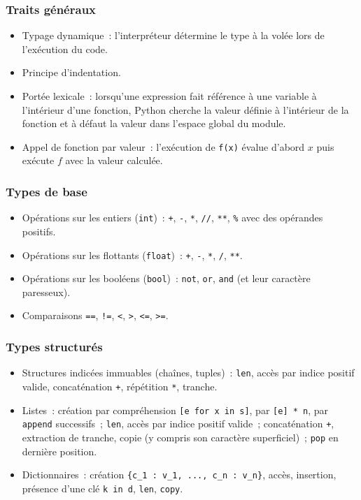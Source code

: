 \documentclass[book]{magnoliaold}
\begin{document}
\subsubsection*{Traits généraux}
\begin{itemize}
\item Typage dynamique~: l'interpréteur détermine le type à la volée lors de l'exécution du code.
\item Principe d'indentation.
\item Portée lexicale~: lorsqu'une expression fait référence à une variable à l'intérieur d'une fonction, Python cherche la valeur définie à l'intérieur de la fonction et à défaut la valeur dans l'espace global du module.
\item Appel de fonction par valeur~: l'exécution de \verb|f(x)| évalue d'abord $x$ puis exécute $f$ avec la valeur calculée.
\end{itemize}

\subsubsection*{Types de base}
\begin{itemize}
\item Opérations sur les entiers (\verb|int|)~: \verb|+|, \verb|-|, \verb|*|, \verb|//|, \verb|**|, \verb|%| avec des opérandes positifs.
\item Opérations sur les flottants (\verb|float|)~: \verb|+|, \verb|-|, \verb|*|, \verb|/|, \verb|**|.
\item Opérations sur les booléens (\verb|bool|)~: \verb|not|, \verb|or|, \verb|and| (et leur caractère paresseux).
\item Comparaisons \verb|==|, \verb|!=|, \verb|<|, \verb|>|, \verb|<=|, \verb|>=|.
\end{itemize}

\subsubsection*{Types structurés}
\begin{itemize}
\item Structures indicées immuables (chaînes, tuples)~: \verb|len|, accès par indice positif valide, concaténation \verb|+|, répétition \verb|*|, tranche.
\item Listes~: création par compréhension \verb|[e for x in s]|, par \verb|[e] * n|, par \verb|append| successifs~; \verb|len|, accès par indice positif valide~; concaténation \verb|+|, extraction de tranche, copie (y compris son caractère superficiel)~; \verb|pop| en dernière position.
\item Dictionnaires~: création \verb|{c_1 : v_1, ..., c_n : v_n}|, accès, insertion, présence d'une clé \verb|k in d|, \verb|len|, \verb|copy|.
\end{itemize}
\end{document}
